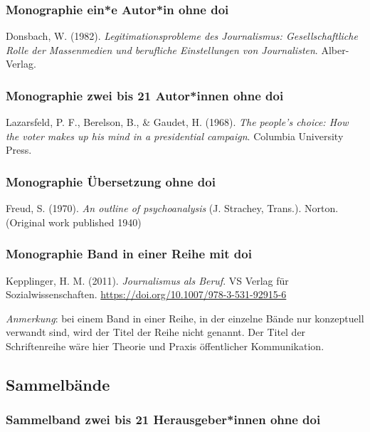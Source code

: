 \documentclass[
  letterpaper,
  DIV=11]{scrreprt}
\begin{document}
\subsubsection{Monographie \textbar{} ein*e Autor*in \textbar{} ohne
doi}\label{monographie-eine-autorin-ohne-doi}

Donsbach, W. (1982). \emph{Legitimationsprobleme des Journalismus:
Gesellschaftliche Rolle der Massenmedien und berufliche Einstellungen
von Journalisten}. Alber-Verlag.

\subsubsection{Monographie \textbar{} zwei bis 21 Autor*innen \textbar{}
ohne doi}\label{monographie-zwei-bis-21-autorinnen-ohne-doi}

Lazarsfeld, P. F., Berelson, B., \& Gaudet, H. (1968). \emph{The
people's choice: How the voter makes up his mind in a presidential
campaign}. Columbia University Press.

\subsubsection{Monographie \textbar{} Übersetzung \textbar{} ohne
doi}\label{monographie-uxfcbersetzung-ohne-doi}

Freud, S. (1970). \emph{An outline of psychoanalysis} (J. Strachey,
Trans.). Norton. (Original work published 1940)

\subsubsection{Monographie \textbar{} Band in einer Reihe \textbar{} mit
doi}\label{monographie-band-in-einer-reihe-mit-doi}

Kepplinger, H. M. (2011). \emph{Journalismus als Beruf}. VS Verlag für
Sozialwissenschaften. \url{https://doi.org/10.1007/978-3-531-92915-6}

\emph{Anmerkung}: bei einem Band in einer Reihe, in der einzelne Bände
nur konzeptuell verwandt sind, wird der Titel der Reihe nicht genannt.
Der Titel der Schriftenreihe wäre hier Theorie und Praxis öffentlicher
Kommunikation.

\subsection{Sammelbände}\label{sammelbuxe4nde}

\subsubsection{Sammelband \textbar{} zwei bis 21 Herausgeber*innen
\textbar{} ohne
doi}\label{sammelband-zwei-bis-21-herausgeberinnen-ohne-doi}
\end{document}
